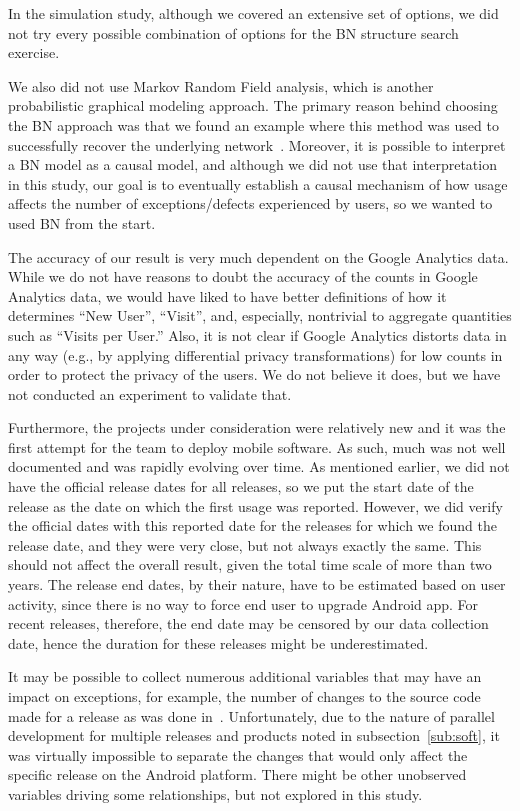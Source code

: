 \documentclass[smallextended]{svjour3}       %
\begin{document}
In the simulation study, although we covered an extensive set of options, we did not try every possible combination of options for the BN structure search exercise.

We also did not use Markov Random Field analysis, which is another probabilistic graphical modeling approach. The primary reason behind choosing the BN approach was that we found an example where this method was used to successfully recover the underlying network~\cite{bnppt}. 
Moreover, it is possible to interpret a BN model as a causal model, and although we did not use that interpretation in this study, our goal is to eventually establish a causal mechanism of how usage affects the number of exceptions/defects experienced by users, so we wanted to used BN from the start.


The accuracy of our result is very much dependent on the Google
Analytics data. While we do not have reasons to doubt the accuracy of
the counts in Google
Analytics data, we would have liked to have better definitions of
how it determines ``New User'', ``Visit'', and, especially,
nontrivial to aggregate quantities such as ``Visits per User.'' Also,
it is not clear if Google
Analytics distorts data in any way (e.g., by applying differential 
privacy transformations) for low counts in order to protect
the privacy of the users. We do not believe it does, but we have not
conducted an experiment to validate that. 

Furthermore, the projects under consideration were relatively new and
it was the first attempt for the team to deploy mobile software. As
such, much was not well documented and was rapidly
evolving over time. As mentioned earlier, we did not have the official release
dates for all releases, so we put the start date of the release as
the date on which the first usage was reported. However, we did
verify the official dates with this reported date for the releases
for which we found the release date, and they were very close, but
not always exactly the same. This should not affect
the overall result, given the total time scale of more than two
years. The release end dates, by their nature, have to be estimated 
based on user activity, since there is no way to force end user
to upgrade Android app. For recent releases, therefore, the end date 
may be censored by our data
collection date, hence the duration for these releases might be
underestimated. 

It may be possible to collect numerous additional variables that may
have an impact on exceptions, for example, the number of changes to
the source code made for a release as was done
in~\cite{IQ08}. Unfortunately, due to the nature of parallel
development for multiple releases and products noted in
subsection~\ref{sub:soft}, it was virtually impossible to separate
the changes that would only affect the specific release on the Android
platform. There might be other unobserved variables driving some
relationships, but not explored in this study. 
\end{document}
